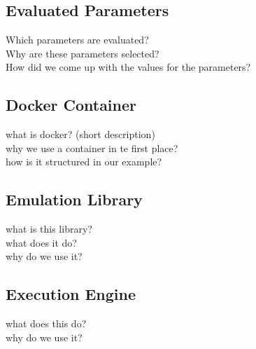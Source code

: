 \subsection{Evaluated Parameters}
Which parameters are evaluated? \\
Why are these parameters selected? \\
How did we come up with the values for the parameters? \\

\subsection{Docker Container}
what is docker? (short description) \\
why we use a container in te first place? \\
how is it structured in our example?

\subsection{Emulation Library}
what is this library? \\
what does it do? \\
why do we use it?

\subsection{Execution Engine}
what does this do? \\
why do we use it?


